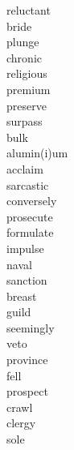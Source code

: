 \documentclass[b5paper, 11pt]{ctexart}
\begin{document}
\begin{multicols*}{3}
\begin{description}
\item[reluctant]

\item[bride]

\item[plunge]

\item[chronic]

\item[religious]

\item[premium]

\item[preserve]

\item[surpass]

\item[bulk]

\item[alumin(i)um]

\item[acclaim]

\item[sarcastic]

\item[conversely]

\item[prosecute]

\item[formulate]

\item[impulse]

\item[naval]

\item[sanction]

\item[breast]

\item[guild]

\item[seemingly]

\item[veto]

\item[province]

\item[fell]

\item[prospect]

\item[crawl]

\item[clergy]

\item[sole]


\end{description}
\end{multicols*}
\end{document}
